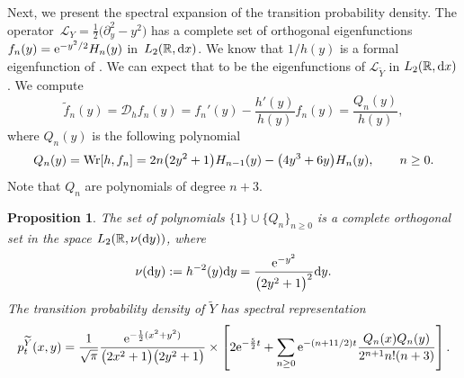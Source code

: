 \documentclass[pdftex]{sigma}
\numberwithin{equation}{section}
\newtheorem{Proposition}[Theorem]{Proposition}
\theoremstyle{definition}
\def\L{{\mathcal L}}
\def\r{{\mathbb R}}
\def\wr{{\textnormal{Wr}}}
\def\d{{\textnormal d}}
\begin{document}
Next, we present the spectral expansion of the transition probability density. The operator~${\L_Y=\frac{1}{2} \bigl(\partial_y^2 - y^2\bigr)}$ has a complete set of orthogonal eigenfunctions $f_n(y)={\rm e}^{-y^2/2}H_n(y)$ in~$L_2(\r,\d x)$. We know that $1/h(y)$ is a formal eigenfunction of . We can expect that 
to be the eigenfunctions of $\L_{\widetilde Y}$ in $L_2(\r, \d x)$. We compute
\[
\tilde f_n(y) ={\mathcal D}_h f_n(y)=f_n'(y)-\frac{h'(y)}{h(y)}f_n(y)=\frac{Q_n(y)}{h(y)},
\]
where $Q_n(y)$ is the following polynomial
\[
Q_n(y)=\wr[h,f_n]=2n\bigl(2y^2+1\bigr) H_{n-1}(y)-\bigl(4y^3+6y\bigr) H_n(y), \qquad n\ge 0.
\]
Note that $Q_n$ are polynomials of degree $n+3$.
\begin{Proposition}
The set of polynomials $\{1\} \cup \{Q_n\}_{n \ge 0}$ is a complete orthogonal set in the space $L_2(\r, \nu(\d y))$, where
\[
\nu(\d y):=h^{-2}(y) \d y=\frac{{\rm e}^{-y^2}}{\bigl(2y^2+1\bigr)^2} \d y.
\]
The transition probability density of $\widetilde Y$ has spectral representation
\begin{equation}\label{OU_spectral}
p^{\widetilde Y}_t(x,y)=
\frac{1}{\sqrt{\pi}} \frac{{\rm e}^{-\frac{1}{2}(x^2+y^2)}}
{\bigl(2x^2+1\bigr)\bigl(2y^2+1\bigr)} \times
\left[ 2 {\rm e}^{-\frac{5}{2} t} +\sum\limits_{n\ge 0} {\rm e}^{-(n+11/2) t} \frac{Q_n(x) Q_n(y)}
{2^{n+1} n! (n+3)} \right].
\end{equation}
\end{Proposition}
\end{document}
